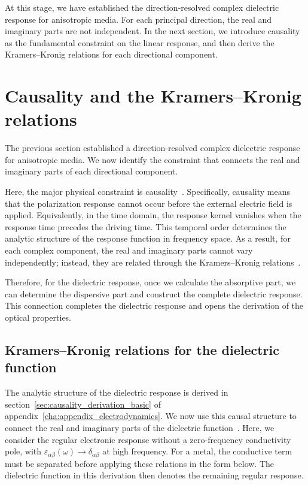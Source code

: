 At this stage, we have established the direction-resolved complex dielectric response for anisotropic media.
For each principal direction, the real and imaginary parts are not independent.
In the next section,
we introduce causality as the fundamental constraint on the linear response,
and then derive the Kramers--Kronig relations for each directional component.

\newpage
\section{Causality and the Kramers--Kronig relations}
\label{sec:causality_and_kramers_kronig_relations}

The previous section established a direction-resolved complex dielectric response for anisotropic media.
We now identify the constraint that connects the real and imaginary parts of each directional component.

Here, the major physical constraint is causality~\cite{toll1956causality}.
Specifically, causality means that the polarization response cannot occur before the external electric field is applied.
Equivalently, in the time domain, the response kernel vanishes when the response time precedes the driving time.
This temporal order determines the analytic structure of the response function in frequency space.
As a result, for each complex component,
the real and imaginary parts cannot vary independently;
instead, they are related through the Kramers--Kronig relations~\cite{de1926theory, toll1956causality, lucarini2005kramers}.

Therefore, for the dielectric response, once we calculate the absorptive part,
we can determine the dispersive part and construct the complete dielectric response.
This connection completes the dielectric response and opens the derivation of the optical properties.

\subsection{Kramers--Kronig relations for the dielectric function}

The analytic structure of the dielectric response is derived in section~\ref{sec:causality_derivation_basic} of appendix~\ref{cha:appendix_electrodynamics}.
We now use this causal structure to connect the real and imaginary parts of the dielectric function~\cite{toll1956causality}.
Here, we consider the regular electronic response without a zero-frequency conductivity pole,
with $\varepsilon_{\alpha\beta}(\omega)\to\delta_{\alpha\beta}$ at high frequency.
For a metal, the conductive term must be separated before applying these relations in the form below.
The dielectric function in this derivation then denotes the remaining regular response.


